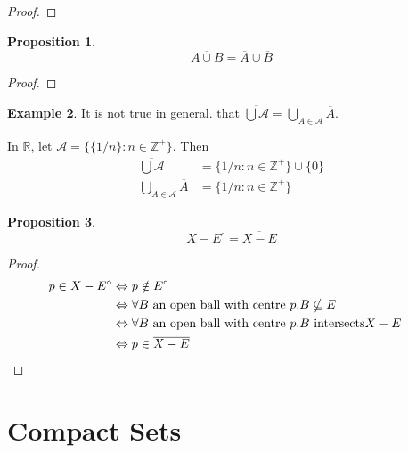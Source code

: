 \documentclass{book}
\let\qed\relax
\newtheorem{prop}{Proposition}[chapter]
\theoremstyle{definition}
\newtheorem{ex}[prop]{Example}
\begin{document}
\begin{proof}
\pf
{}
\qed
\end{proof}

\begin{prop}
\[ \overline{A \cup B} = \overline{A} \cup \overline{B} \]
\end{prop}

\begin{proof}
\pf
{}
\qed
\end{proof}

\begin{ex}
It is not true in general. that $\overline{\bigcup \mathcal{A}} = \bigcup_{A \in \mathcal{A}} \overline{A}$.

In $\mathbb{R}$, let $\mathcal{A} = \{ \{ 1/n \} : n \in \mathbb{Z}^+ \}$. Then
\begin{align*}
\overline{\bigcup \mathcal{A}} & = \{ 1/n : n \in \mathbb{Z}^+ \} \cup \{ 0 \} \\
\bigcup_{A \in \mathcal{A}} \overline{A} & = \{ 1/n : n \in \mathbb{Z}^+ \}
\end{align*}
\end{ex}

\begin{prop}
\[ X - E^\circ = \overline{X - E} \]
\end{prop}

\begin{proof}
\pf
\begin{align*}
p \in X - E^\circ & \Leftrightarrow p \notin E^\circ \\
& \Leftrightarrow \forall B \text{ an open ball with centre } p. B \nsubseteq E \\
& \Leftrightarrow \forall B \text{ an open ball with centre } p. B \text{ intersects} X - E \\
& \Leftrightarrow p \in \overline{X - E} & \qed
\end{align*}
\end{proof}

\section{Compact Sets}
\end{document}
